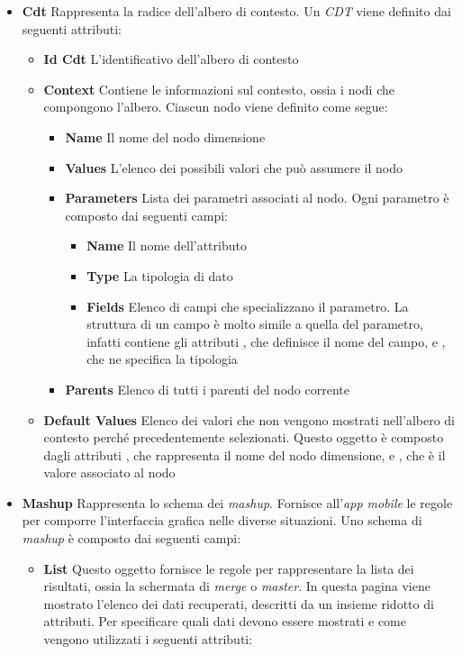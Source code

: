 \begin{itemize}
	\item \textbf{Cdt}
	Rappresenta la radice dell'albero di contesto. Un \emph{CDT} viene definito dai seguenti attributi:
	\begin{itemize}
		\item \textbf{Id Cdt}
		L'identificativo dell'albero di contesto
		\item \textbf{Context}
		Contiene le informazioni sul contesto, ossia i nodi che compongono l'albero. Ciascun nodo viene definito come segue:
		\begin{itemize}
			\item \textbf{Name}
			Il nome del nodo dimensione
			\item \textbf{Values}
			L'elenco dei possibili valori che può assumere il nodo
			\item \textbf{Parameters}
			Lista dei parametri associati al nodo. Ogni parametro è composto dai seguenti campi:
			\begin{itemize}
				\item \textbf{Name}
				Il nome dell'attributo
				\item \textbf{Type}
				La tipologia di dato
				\item \textbf{Fields}
				Elenco di campi che specializzano il parametro. La struttura di un campo è molto simile a quella del parametro, infatti contiene gli attributi , che definisce il nome del campo, e , che ne specifica la tipologia
			\end{itemize}
			\item \textbf{Parents}
			Elenco di tutti i parenti del nodo corrente
		\end{itemize}
		\item \textbf{Default Values}
		Elenco dei valori che non vengono mostrati nell'albero di contesto perché precedentemente selezionati. Questo oggetto è composto dagli attributi , che rappresenta il nome del nodo dimensione, e , che è il valore associato al nodo
	\end{itemize}
	\item \textbf{Mashup}
	Rappresenta lo schema dei \emph{mashup}. Fornisce all'\emph{app mobile} le regole per comporre l'interfaccia grafica nelle diverse situazioni. Uno schema di \emph{mashup} è composto dai seguenti campi:
	\begin{itemize}
		\item \textbf{List}
		Questo oggetto fornisce le regole per rappresentare la lista dei risultati, ossia la schermata di \emph{merge} o \emph{master}. In questa pagina viene mostrato l'elenco dei dati recuperati, descritti da un insieme ridotto di attributi. Per specificare quali dati devono essere mostrati e come vengono utilizzati i seguenti attributi:

\end{itemize}
\end{itemize}
